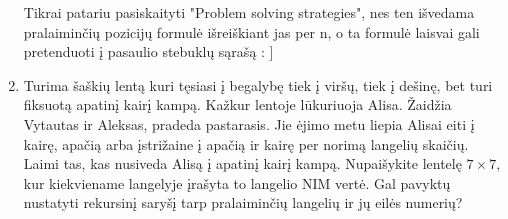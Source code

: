 \begin{enumerate}



\begin{pastaba}
Tikrai patariu pasiskaityti "Problem solving strategies", nes ten išvedama pralaiminčių pozicijų formulė išreiškiant jas per n, o ta formulė laisvai gali pretenduoti į pasaulio stebuklų sąrašą : ] 
\end{pastaba}

\item Turima šaškių lentą kuri tęsiasi į begalybę tiek į viršų, tiek į dešinę, bet turi fiksuotą apatinį kairį kampą. Kažkur lentoje lūkuriuoja Alisa. Žaidžia Vytautas ir Aleksas, pradeda pastarasis. Jie ėjimo metu liepia Alisai eiti į kairę, apačią arba įstrižaine į apačią ir kairę per norimą langelių skaičių. Laimi tas, kas nusiveda Alisą į apatinį kairį kampą. Nupaišykite lentelę $7\times 7$, kur kiekviename langelyje įrašyta to langelio NIM vertė. Gal pavyktų nustatyti rekursinį saryšį tarp pralaiminčių langelių ir jų eilės numerių? 



\end{enumerate}
